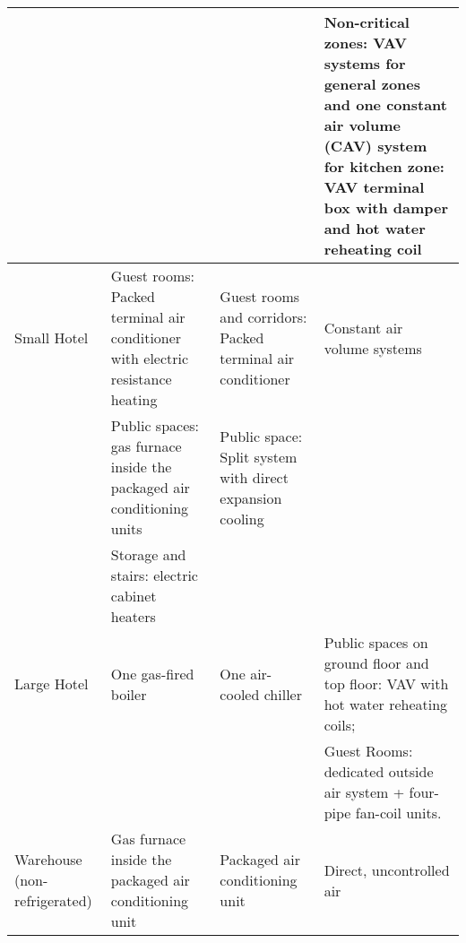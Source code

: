 \begin{table}[h!]
\begin{longtable}{p{2cm}|p{2cm}|p{4cm}|p{4cm}}
                               &                                                                                 &                                                                              & Non-critical zones: VAV systems for general zones and one constant air volume (CAV) system for kitchen zone: VAV terminal box with damper and hot water reheating coil \\
  \hline
  Small Hotel                  & Guest rooms:  Packed terminal air conditioner with electric resistance heating  & Guest rooms and corridors:  Packed terminal air conditioner                  & Constant air volume systems                                                                                                                                            \\
                               & Public spaces:  gas furnace inside the packaged air conditioning units          & Public space:  Split system with direct expansion cooling                                  &                                                                                                                                                                        \\
                               & Storage and stairs: electric cabinet heaters                                    &                                                                              &                                                                                                                                                                        \\
  \hline
  Large Hotel                  & One gas-fired boiler                                                            & One air-cooled chiller                                                       & Public spaces on ground floor and top floor: VAV with hot water reheating coils;                                                                                       \\
                               &                                                                                 &                                                                              & Guest Rooms:  dedicated outside air system + four-pipe fan-coil units.                                                                                                 \\
  \hline
  Warehouse (non-refrigerated) & Gas furnace inside the packaged air conditioning unit                           & Packaged air conditioning unit                                               & Direct, uncontrolled air                                                                                                                                               \\

\end{longtable}
\end{table}
